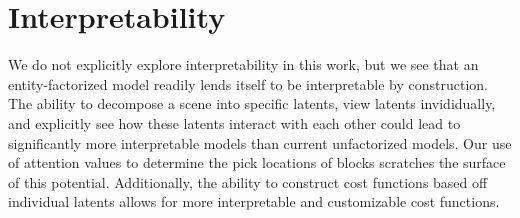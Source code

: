 \section{Interpretability}
We do not explicitly explore interpretability in this work, but we see that an entity-factorized model readily lends itself to be interpretable by construction. The ability to decompose a scene into specific latents, view latents invididually, and explicitly see how these latents interact with each other could lead to significantly more interpretable models than current unfactorized models. Our use of attention values to determine the pick locations of blocks scratches the surface of this potential. Additionally, the ability to construct cost functions based off individual latents allows for more interpretable and customizable cost functions.